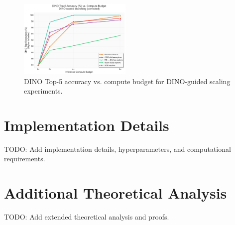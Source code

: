 \documentclass{article}
\begin{document}
\begin{figure}[H]
  \centering
  \includegraphics[width=0.48\textwidth]{figures/scaling_dino_top5.pdf}
  \caption{DINO Top-5 accuracy vs. compute budget for DINO-guided scaling experiments.}
  \label{fig:dino-scaling-complete}
\end{figure}

\section{Implementation Details}

TODO: Add implementation details, hyperparameters, and computational requirements.

\section{Additional Theoretical Analysis}

TODO: Add extended theoretical analysis and proofs.

\end{document}
